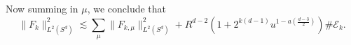 \documentclass[dvipsnames,letterpaper,12pt]{article}
\begin{document}
%
Now summing in $\mu$, we conclude that
%
\[ \| F_k \|_{L^2(S^d)}^2 \lesssim \sum_\mu \| F_{k,\mu} \|_{L^2(S^d)}^2 + R^{d-2} \left( 1 + 2^{k(d-1)} u^{1 - a \left( \frac{d-3}{2} \right)} \right) \# \mathcal{E}_k. \]
\begin{comment}

But this means that
%
\[ \sum_{(x_1,t_1) \in \mathcal{H}_{x_0,t_0,l}} |\langle {S\!}_{x_0,t_0}, {S\!}_{x_1,t_1} \rangle| \lesssim (2^l u^a)^{- \frac{d-1}{2}} (u^{a+1} 2^l) = u^{1 - a \left( \frac{d-3}{2} \right)} 2^{- l \left( \frac{d-3}{2} \right)}. \]
%
Since $d \geq 4$, we can sum to conclude that
%
\[ \sum_{1 \leq l \leq k - a \log_2 u} \]
Summing over $1 \leq l \leq k - a \log_2 u$, 

\[ \lesssim \frac{1}{(R d_g(x_0,x_1))^{\frac{d-1}{2}}} \langle R | d_g(x_0,x_1) - (t_0 - t_1) | \rangle^{-M} \]


 and $0 \leq l \lesssim R u^{-a}$, define
%
\[ \mathcal{H}_{x_0,t_0,l} = \left\{ (x_1,t_1) \in \mathcal{E}_{k,\mu'} : l(u^a / R) \leq d_g(x_0,x_1) \leq (l+1)(u^a/R) \right\}. \]
%
Note that for $(x_0,t_0) \in \mathcal{E}_{k,\mu}$ and $(x_1,t_1) \in \mathcal{E}_{k,\mu'}$, $t_0 - t_1$ lies in a radius $O(u^a / R)$ interval centered at $(\mu - \mu') (u^a / R)$:
%
\begin{itemize}
    \item For $0 \leq l \leq (\mu - \mu') / 2$, if $(x_1,t_1) \in \mathcal{H}_{x_0,t_0,l}$, then $x_1$ lies in a thickness $O(u^a / R)$, radius $l (u^a / R)$ geodesic annulus centered at $x_0$. Thus $\mathcal{H}_{x_0,t_0,l}$ is covered by $O( \langle l \rangle ^{d-1})$ balls of radius $u^a / R$. Note that we incurred the logarithmic error in $u$ so that we can assume $u^a \leq 2^k$, so that the density properties of $\mathcal{E}_k$ imply that
    \[ \# \mathcal{H}_{x_0,t_0,l} \lesssim (Ru) \langle l^{d-1} \rangle (u^a / R) = u^{a+1} \langle l \rangle^{d-1}. \]
    Together with Lemma \ref{mainOrthogonalityLemma}, we conclude that
    \[ \sum_{(x_1,t_1) \in \mathcal{H}_{x_0,t_0,l}} |\langle {S\!}_{x_0,t_0}, {S\!}_{x_1,t_1} \rangle| \lesssim_M ( u^{a+1} \langle l \rangle^{d-1} ) \left( \langle l u^a \rangle^{- \frac{d-1}{2}} \left( (\mu - \mu') u^a \right)^{-M} \right). \]
    Picking $M \gtrsim d$ and summing over $0 \leq l \leq (\mu - \mu') / 2$, $\mu' \leq \mu - 10$, and $(x_0,t_0) \in \mathcal{E}_{k,\mu}$ gives that
    \[ \sum_{(x_0,t_0) \in \mathcal{E}_{k,\mu}} \sum_{\mu' \leq \mu - 10} \sum_{0 \leq l \leq (\mu - \mu') / 2} \sum_{(x_1,t_1) \in \mathcal{H}_{x_0,t_0,l}'} |\langle {S\!}_{x_0,t_0}, {S\!}_{x_1,t_1} \rangle| \lesssim \# \mathcal{E}_{k,\mu}. \]


\end{comment}
\end{document}
